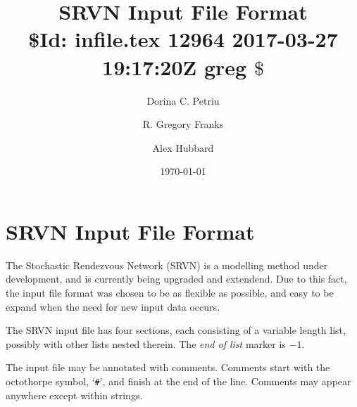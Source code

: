 \documentclass{article}
\begin{document}
\title{SRVN Input File Format\\ {\small\rm\$Id: infile.tex 12964 2017-03-27 19:17:20Z greg $\$$}}
\author {Dorina C. Petriu \and R. Gregory Franks \and Alex Hubbard}
\date{\today} 
\maketitle

\section{SRVN Input File Format}
The Stochastic Rendezvous Network (SRVN) is a modelling method under
development, and is currently being upgraded and extendend. Due to
this fact, the input file format was chosen to be as flexible as
possible, and easy to be expand when the need for new input data
occurs.

The SRVN input file has four sections, each consisting of a variable
length list, possibly with other lists nested therein.  The {\em end
of list} marker is $-1$.

The input file may be annotated with comments.
Comments start with the octothorpe symbol, `{\tt \#}', and finish at the
end of the line.  Comments may appear anywhere except within strings.
\end{document}
